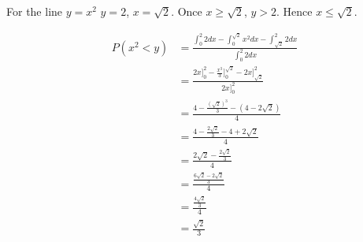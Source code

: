 \documentclass[9pt]{article}
\begin{document}
For the line $y = x^2$ $y = 2$, $x = \sqrt{2}$. Once $x \ge \sqrt{2}$, $y > 2$. Hence $x \leq \sqrt{2}$.

\begin{align*}
  P(x^2 < y) &= \frac{\int_0^2 2 dx - \int_0^{\sqrt{2}} x^2 dx - \int_{\sqrt{2}}^2 2 dx}{\int_0^2 2 dx} \\
  &= \frac{2x \bigg]_0^2 - \frac{x^3}{3} \bigg]_0^{\sqrt{2}} - 2x \bigg]_{\sqrt{2}}^2}{2x \bigg]_0^2} \\
  &= \frac{4 - \frac{(\sqrt{2})^3}{3} - (4 - 2\sqrt{2})}{4} \\
  &= \frac{4 - \frac{2\sqrt{2}}{3} - 4 + 2\sqrt{2}}{4} \\
  &= \frac{2\sqrt{2} - \frac{2\sqrt{2}}{3}}{4} \\
  &= \frac{\frac{6 \sqrt{2} - 2\sqrt{2}}{3}}{4} \\
  &= \frac{\frac{4 \sqrt{2}}{3}}{4} \\
  &= \frac{\sqrt{2}}{3}
\end{align*}
\end{document}
